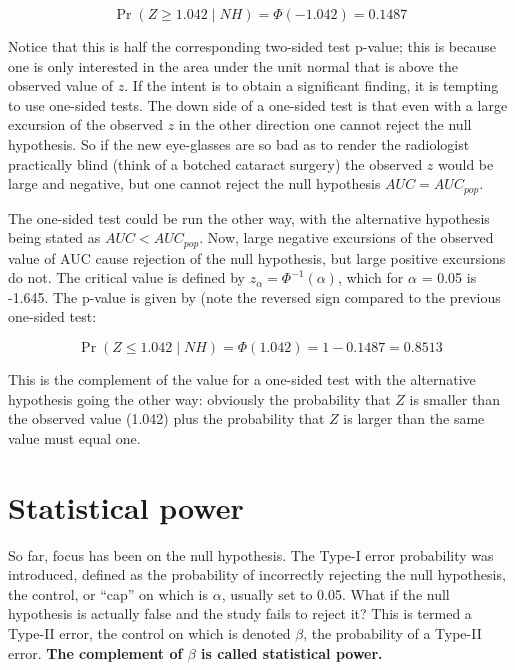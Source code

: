 \documentclass[
]{book}
\begin{document}
\begin{equation*} 
\Pr\left ( Z \geq 1.042 \mid NH \right ) = \Phi \left (-1.042  \right ) = 0.1487
\end{equation*}

Notice that this is half the corresponding two-sided test p-value; this is because one is only interested in the area under the unit normal that is above the observed value of \(z\). If the intent is to obtain a significant finding, it is tempting to use one-sided tests. The down side of a one-sided test is that even with a large excursion of the observed \(z\) in the other direction one cannot reject the null hypothesis. So if the new eye-glasses are so bad as to render the radiologist practically blind (think of a botched cataract surgery) the observed \(z\) would be large and negative, but one cannot reject the null hypothesis \(AUC=AUC_{pop}\).

The one-sided test could be run the other way, with the alternative hypothesis being stated as \(AUC<AUC_{pop}\). Now, large negative excursions of the observed value of AUC cause rejection of the null hypothesis, but large positive excursions do not. The critical value is defined by \(z_\alpha = \Phi^{-1}\left (\alpha \right )\), which for \(\alpha\) = 0.05 is -1.645. The p-value is given by (note the reversed sign compared to the previous one-sided test:

\begin{equation*} 
\Pr\left ( Z \leq 1.042 \mid NH  \right ) = \Phi(1.042) = 1 - 0.1487 = 0.8513
\end{equation*}

This is the complement of the value for a one-sided test with the alternative hypothesis going the other way: obviously the probability that \(Z\) is smaller than the observed value (1.042) plus the probability that \(Z\) is larger than the same value must equal one.

\hypertarget{statistical-power}{%
\section{Statistical power}\label{statistical-power}}

So far, focus has been on the null hypothesis. The Type-I error probability was introduced, defined as the probability of incorrectly rejecting the null hypothesis, the control, or ``cap'' on which is \(\alpha\), usually set to 0.05. What if the null hypothesis is actually false and the study fails to reject it? This is termed a Type-II error, the control on which is denoted \(\beta\), the probability of a Type-II error. \textbf{The complement of \(\beta\) is called statistical power.}
\end{document}
